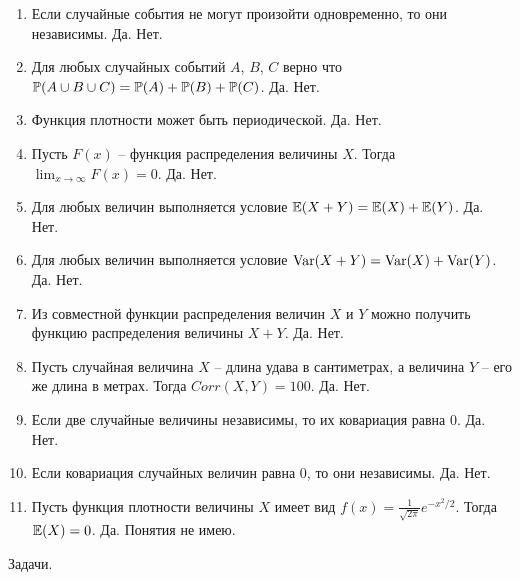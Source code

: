\documentclass[12pt, a4paper]{article}\usepackage[]{graphicx}\usepackage[]{color}
\begin{document}
	\begin{enumerate}
		\item Если случайные события не могут произойти одновременно, то они независимы. Да. Нет.
		\item  Для любых случайных событий $A$, $B$, $C$ верно что $\P(A\cup B\cup C)=\P(A)+\P(B)+\P(C)$. Да. Нет.
		\item  Функция плотности может быть периодической. Да. Нет.
		\item  Пусть $F(x)$ -- функция распределения величины $X$. Тогда $\lim_{x\to\infty} F(x)=0$. Да. Нет.
		\item  Для любых величин выполняется условие $\E(X+Y)=\E(X)+\E(Y)$. Да. Нет.
		\item  Для любых величин выполняется условие $\Var(X+Y)=\Var(X)+\Var(Y)$. Да. Нет.
		\item  Из совместной функции распределения величин $X$ и $Y$ можно получить функцию распределения величины $X+Y$. Да. Нет.
		\item  Пусть случайная величина $X$ -- длина удава в сантиметрах, а величина $Y$ -- его же длина в метрах. Тогда $Corr(X,Y)=100$. Да. Нет.
		\item  Если две случайные величины независимы, то их ковариация равна 0. Да. Нет.
		\item  Если ковариация случайных величин равна 0, то они независимы. Да. Нет.
		\item  Пусть функция плотности величины $X$ имеет вид  $f(x)=\frac{1}{\sqrt{2\pi}}e^{-x^2/2}$. Тогда $\E(X)=0$. Да. Понятия не имею.
	\end{enumerate}

	Задачи.
\end{document}
